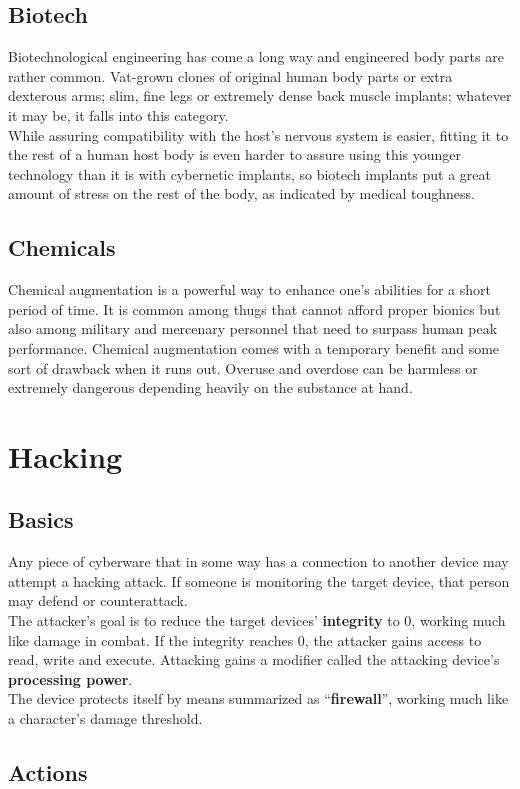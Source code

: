\documentclass[12pt,a4paper,openany]{book}
\begin{document}
	\section{Biotech}
	Biotechnological engineering has come a long way and engineered body parts are rather common. Vat-grown clones of original human body parts or extra dexterous arms; slim, fine legs or extremely dense back muscle implants; whatever it may be, it falls into this category.\\
	While assuring compatibility with the host's nervous system is easier, fitting it to the rest of a human host body is even harder to assure using this younger technology than it is with cybernetic implants, so biotech implants put a great amount of stress on the rest of the body, as indicated by medical toughness.
	\section{Chemicals}
	Chemical augmentation is a powerful way to enhance one’s abilities for a short period of time. It is common among thugs that cannot afford proper bionics but also among military and mercenary personnel that need to surpass human peak performance. Chemical augmentation comes with a temporary benefit and some sort of drawback when it runs out. Overuse and overdose can be harmless or extremely dangerous depending heavily on the substance at hand.
	
	\chapter{Hacking}
	\section{Basics}
	Any piece of cyberware that in some way has a connection to another device may attempt a hacking attack. If someone is monitoring the target device, that person may defend or counterattack.\\
	The attacker’s goal is to reduce the target devices’ \textbf{integrity} to 0, working much like damage in combat. If the integrity reaches 0, the attacker gains access to read, write and execute. Attacking gains a modifier called the attacking device’s \textbf{processing power}.\\
	The device protects itself by means summarized as “\textbf{firewall}”, working much like a character’s damage threshold.
	\section{Actions}
\end{document}
